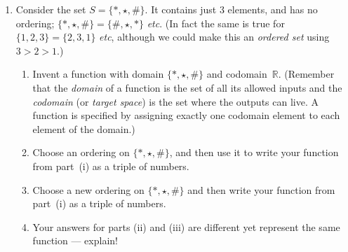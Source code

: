 \begin{enumerate}
\item \label{ch1rev} \hypertarget{Consider the set}{Consider the set} $S=\{*, \star, \# \}$. 
It contains just 3 elements, and has no  ordering; 
$\{*, \star, \# \}= \{ \# , \star, * \}$ {\itshape etc}. 
(In fact the same is true for  $\{1,2,3\}=\{2,3,1\}$ {\itshape etc}, although we could make this an {\itshape ordered set} using $3>2>1$.) 
\begin{enumerate}\renewcommand{\theenumi}{(\roman*{enumi})}
\item \label{wasa} Invent a  function with domain $\{*, \star, \# \}$ and co\-domain~$\mathbb{R}$. (Remember that the {\itshape domain} of a function is the set of all its allowed  inputs and the {\itshape codomain} (or {\itshape target space}) is the set where the outputs can live. A function is specified by assigning exactly one codomain element to each element of the domain.)\\
\item Choose an ordering on  $\{*, \star, \# \}$, and then use it to write your function from part~(i) as a triple of numbers. \\
\item Choose a new ordering on $\{*, \star, \# \}$ and then write your function from part~(i) as a triple of numbers. \\
\item Your answers for parts (ii) and (iii) are different yet represent the same function --- explain!
\end{enumerate}





\end{enumerate}
